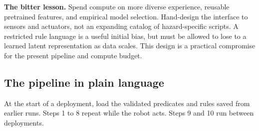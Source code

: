 \documentclass[10pt]{article}
\begin{document}
\textbf{The bitter lesson.} Spend compute on more diverse experience, reusable pretrained features, and empirical model selection. Hand-design the interface to sensors and actuators, not an expanding catalog of hazard-specific scripts. A restricted rule language is a useful initial bias, but must be allowed to lose to a learned latent representation as data scales. This design is a practical compromise for the present pipeline and compute budget.

\subsection{The pipeline in plain language}
At the start of a deployment, load the validated predicates and rules saved from earlier runs. Steps 1 to 8 repeat while the robot acts. Steps 9 and 10 run between deployments.
\end{document}
